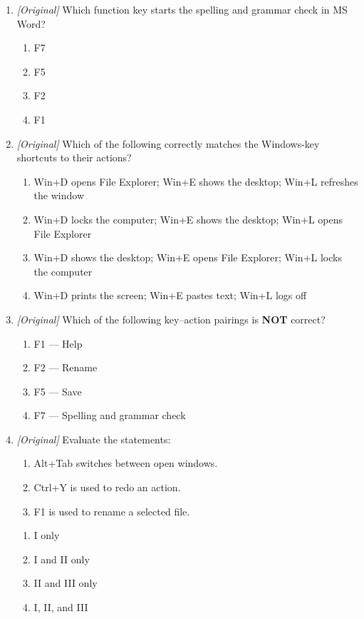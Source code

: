 \begin{enumerate}[label=\textbf{Q\arabic*.}, leftmargin=*]
\begin{enumerate}[label=\Alph*.]
    \item F7
  \end{enumerate}
\item \textit{[Original]} Which function key starts the spelling and grammar
  check in MS Word?
  \begin{enumerate}[label=\Alph*.]
    \item F7
    \item F5
    \item F2
    \item F1
  \end{enumerate}
\item \textit{[Original]} Which of the following correctly matches the
  Windows-key shortcuts to their actions?
  \begin{enumerate}[label=\Alph*.]
    \item Win+D opens File Explorer; Win+E shows the desktop; Win+L refreshes
      the window
    \item Win+D locks the computer; Win+E shows the desktop; Win+L opens File
      Explorer
    \item Win+D shows the desktop; Win+E opens File Explorer; Win+L locks the
      computer
    \item Win+D prints the screen; Win+E pastes text; Win+L logs off
  \end{enumerate}
\item \textit{[Original]} Which of the following key--action pairings is
  \textbf{NOT} correct?
  \begin{enumerate}[label=\Alph*.]
    \item F1 --- Help
    \item F2 --- Rename
    \item F5 --- Save
    \item F7 --- Spelling and grammar check
  \end{enumerate}
\item \textit{[Original]} Evaluate the statements:
  \begin{enumerate}[label=\Roman*.]
    \item Alt+Tab switches between open windows.
    \item Ctrl+Y is used to redo an action.
    \item F1 is used to rename a selected file.
  \end{enumerate}
  \begin{enumerate}[label=\Alph*.]
    \item I only
    \item I and II only
    \item II and III only
    \item I, II, and III
  \end{enumerate}


\end{enumerate}
